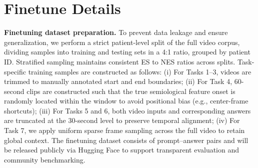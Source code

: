 \documentclass{article}
\theoremstyle{plain}
\theoremstyle{definition}
\theoremstyle{remark}
\begin{document}

\section{Finetune Details}
\label{sec:finetune_details}

\textbf{Finetuning dataset preparation.} To prevent data leakage and ensure generalization, we perform a strict patient-level split of the full video corpus, dividing samples into training and testing sets in a 4:1 ratio, grouped by patient ID. Stratified sampling maintains consistent ES to NES ratios across splits. Task-specific training samples are constructed as follows: (i) For Tasks 1–3, videos are trimmed to manually annotated start and end boundaries; (ii) For Task 4, 60-second clips are constructed such that the true semiological feature onset is randomly located within the window to avoid positional bias (e.g., center-frame shortcuts); (iii) For Tasks 5 and 6, both video inputs and corresponding answers are truncated at the 30-second level to preserve temporal alignment; (iv) For Task 7, we apply uniform sparse frame sampling across the full video to retain global context. The finetuning dataset consists of prompt–answer pairs and will be released publicly via Hugging Face to support transparent evaluation and community benchmarking.
\end{document}
